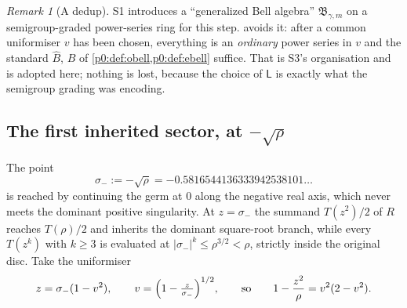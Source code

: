 \documentclass[11pt,a4paper,oneside]{book}
\theoremstyle{plain}
\theoremstyle{definition}
\theoremstyle{remark}
\newtheorem{remark}[theorem]{Remark}
\newcommand{\OB}{\widehat{B}}
\newcommand{\EB}{B}
\begin{document}
\begin{remark}[A dedup]
\label{p1:rem:generalised-bell}
\textsf{S1} introduces a ``generalized Bell algebra'' $\mathfrak B_{\gamma,m}$ on a
semigroup-graded power-series ring for this step.  avoids it:
after a common uniformiser $v$ has been chosen, everything is an \emph{ordinary} power series
in $v$ and the standard $\OB$, $\EB$ of \cref{p0:def:obell,p0:def:ebell} suffice.  That is
\textsf{S3}'s organisation and is adopted here; nothing is lost, because the choice of
$\mathsf L$ is exactly what the semigroup grading was encoding.
\end{remark}

\subsection{The first inherited sector, at $-\sqrt\rho$}
\label{p1:sub:minus}

The point
\begin{equation}
 \sigma_-:=-\sqrt\rho=-0.5816544136333942538101\ldots
 \label{p1:eq:sigma-minus}
\end{equation}
is reached by continuing the germ at $0$ along the negative real axis, which never meets the
dominant positive singularity.  At $z=\sigma_-$ the summand $T(z^{2})/2$ of $R$ reaches
$T(\rho)/2$ and inherits the dominant square-root branch, while every $T(z^{k})$ with $k\ge3$
is evaluated at $|\sigma_-|^{k}\le\rho^{3/2}<\rho$, strictly inside the original disc.  Take
the uniformiser
\begin{equation}
 z=\sigma_-(1-v^{2}),\qquad v=\Bigl(1-\tfrac{z}{\sigma_-}\Bigr)^{1/2},
 \qquad\text{so}\qquad
 1-\frac{z^{2}}{\rho}=v^{2}(2-v^{2}).
 \label{p1:eq:v-minus}
\end{equation}
\end{document}
